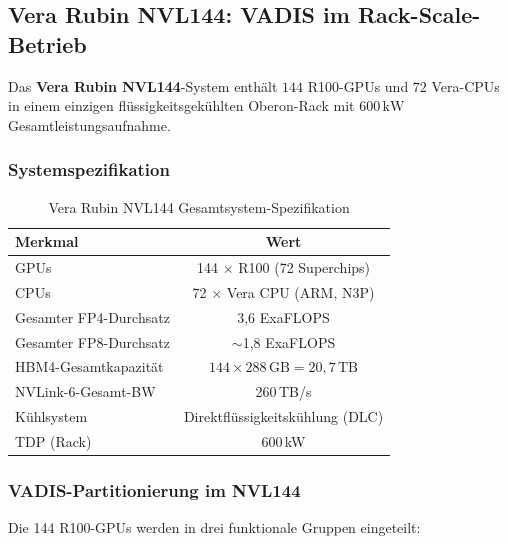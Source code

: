 ﻿\documentclass[12pt,a4paper]{article}
\begin{document}
\subsection{Vera Rubin NVL144: VADIS im Rack-Scale-Betrieb}
\label{sub:nvl144}

Das \textbf{Vera Rubin NVL144}-System enthält
$144$ R100-GPUs und $72$ Vera-CPUs in einem einzigen
flüssigkeitsgekühlten Oberon-Rack mit $600\,\text{kW}$
Gesamtleistungsaufnahme.

\subsubsection{Systemspezifikation}

\begin{table}[ht]
\centering
\small
\caption{Vera Rubin NVL144 Gesamtsystem-Spezifikation}
\label{tab:nvl144}
\begin{tabular}{@{}lc@{}}
\toprule
\textbf{Merkmal} & \textbf{Wert} \\
\midrule
GPUs & 144 $\times$ R100 (72 Superchips) \\
CPUs & 72 $\times$ Vera CPU (ARM, N3P) \\
Gesamter FP4-Durchsatz & 3,6 ExaFLOPS \\
Gesamter FP8-Durchsatz & $\sim$1,8 ExaFLOPS \\
HBM4-Gesamtkapazität & $144 \times 288\,\text{GB} = 20{,}7\,\text{TB}$ \\
NVLink-6-Gesamt-BW & 260\,TB/s \\
Kühlsystem & Direktflüssigkeitskühlung (DLC) \\
TDP (Rack) & 600\,kW \\
\bottomrule
\end{tabular}
\end{table}

\subsubsection{VADIS-Partitionierung im NVL144}

Die 144 R100-GPUs werden in drei funktionale Gruppen eingeteilt:
\end{document}
